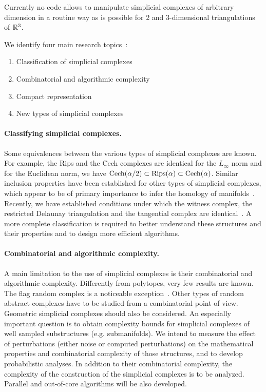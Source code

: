  Currently no code allows to manipulate simplicial complexes of arbitrary dimension in a routine way as is possible for 2 and 3-dimensional triangulations of $\mathbb R ^3$.

We identify four main research topics~:
\begin{enumerate}
\item Classification of simplicial complexes
\item Combinatorial and algorithmic complexity 
\item Compact representation
\item New types of simplicial complexes
\end{enumerate}

\paragraph{Classifying simplicial complexes.}
Some equivalences between the various types of simplicial complexes are known. For example,
the Rips and the \u{C}ech complexes are identical for the $L_{\infty}$ norm and for the Euclidean norm, we have $ {\rm {C}ech} ({\alpha}/{2}) \subset {\rm Rips} (\alpha) \subset {\rm {C}ech} (\alpha)$. Similar inclusion properties have been established for other types of simplicial complexes, which appear to be of primary importance to infer the homology of manifolds~\cite{}.
Recently, we have established conditions under which the witness complex, the restricted Delaunay triangulation and the tangential complex are identical~\cite{}. A more complete classification is required to better understand these structures and their properties and to design
more efficient algorithms.




\paragraph{Combinatorial and algorithmic complexity.}
A main limitation to the use of simplicial complexes is their combinatorial and algorithmic complexity.  Differently from polytopes, very few results are known. The flag random complex is a noticeable exception~\cite{}. Other types of random abstract complexes have to be studied from a combinatorial point of view. Geometric simplicial complexes should also be considered.  An especially important question is to obtain complexity bounds for simplicial complexes of well sampled substructures (e.g. submanifolds).  We intend to measure the effect of perturbations (either noise or computed perturbations) on the mathematical properties and combinatorial complexity of those structures, and to develop probabilistic analyses. In addition to their combinatorial complexity, the complexity of the construction of the simplicial complexes is to be analyzed.  Parallel and out-of-core algorithms will be also developed.



